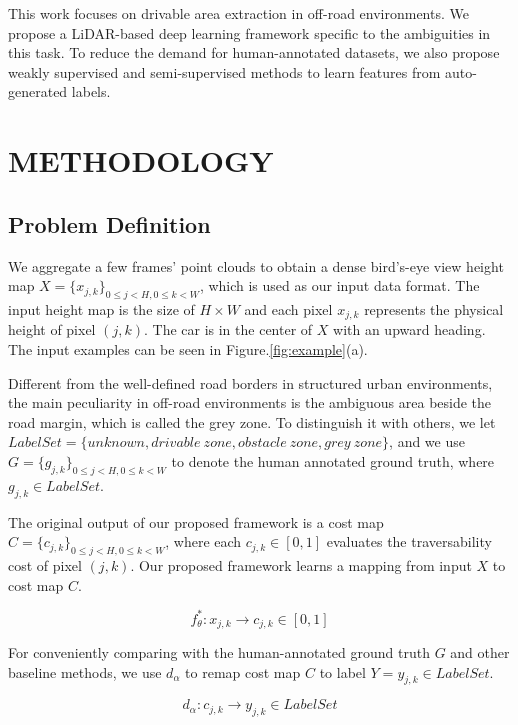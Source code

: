 \documentclass[letterpaper, 10 pt, conference]{ieeeconf}  %
\begin{document}
This work focuses on drivable area extraction in off-road environments. We propose a LiDAR-based deep learning framework specific to the ambiguities in this task. To reduce the demand for human-annotated datasets, we also propose weakly supervised and semi-supervised methods to learn features from auto-generated labels.

\section{METHODOLOGY}	\label{sec:method}

\subsection{Problem Definition}

We aggregate a few frames' point clouds to obtain a dense bird's-eye view height map $X=\{x_{j,k}\}_{0\le j<H,0\le k<W}$, which is used as our input data format. The input height map is the size of $H\times W$ and each pixel $x_{j,k}$ represents the physical height of pixel $(j,k)$. The car is in the center of $X$ with an upward heading. The input examples can be seen in Figure.\ref{fig:example}(a).

Different from the well-defined road borders in structured urban environments, the main peculiarity in off-road environments is the ambiguous area beside the road margin, which is called the grey zone. To distinguish it with others, we let $Label Set=\{unknown,drivable\ zone,obstacle\ zone,grey\ zone\}$, and we use $G=\{g_{j,k}\}_{0\le j<H,0\le k<W}$ to denote the human annotated ground truth, where $g_{j,k}\in LabelSet$.

The original output of our proposed framework is a cost map $C=\{c_{j,k}\}_{0\le j<H,0\le k<W}$, where each $c_{j,k}\in [0,1]$ evaluates the traversability cost of pixel $(j,k)$. Our proposed framework learns a mapping from input $X$ to cost map $C$.

\vspace{-2mm}
\begin{equation}
f_\theta^*:x_{j,k}\rightarrow c_{j,k} \in [0,1]
\end{equation}

For conveniently comparing with the human-annotated ground truth $G$ and other baseline methods, we use $d_\alpha$ to remap cost map $C$ to label $Y=y_{j,k}\in LabelSet$.


\vspace{-2mm}
\begin{equation}
d_\alpha:c_{j,k}\rightarrow y_{j,k} \in LabelSet
\end{equation}
\end{document}
